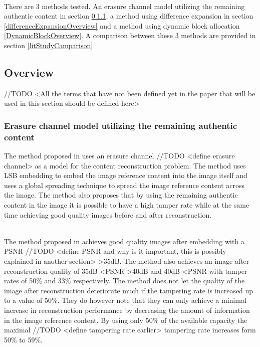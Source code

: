 \documentclass[12pt]{article}
\begin{document}
\hspace{0pt} \\
There are 3 methods tested. An erasure channel model utilizing the remaining authentic content in section \ref{ErasureChannelOverview}, a method using difference expansion in section \ref{differenceExpansionOverview} and a method using dynamic block allocation \ref{DynamicBlockOverview}. A comparison between these 3 methods are provided in section \ref{litStudyCamparison}

\subsection{Overview}
//TODO <All the terms that have not been defined yet in the paper that will be used in this section should be defined here>

\subsubsection{Erasure channel model utilizing the remaining authentic content}
\label{ErasureChannelOverview}
The method proposed in \cite {korus2013efficient} uses an erasure channel
//TODO <define erasure channel> 
as a model for the content reconstruction problem.
The method uses LSB embedding to embed the image reference content into the image itself and uses a global spreading technique to spread the image reference content across the image.
The method also proposes that by using the remaining authentic content in the image it is possible to have a high tamper rate while at the same time achieving good quality images before and after reconstruction.

\hspace{0pt} \\
The method proposed in \cite {korus2013efficient} achieves good quality images after embedding with a PSNR 
//TODO <define PSNR and why is it important, this is possibly explained in another section> 
\textgreater 35dB. 
The method also achieves an image after reconstruction quality of 35dB \textless PSNR \textgreater 40dB and 40dB \textless PSNR with tamper rates of 50\% and 33\% respectively.
The method does not let the quality of the image after reconstruction deteriorate much if the tampering rate is increased up to a value of 50\%.
They do however note that they can only achieve a minimal increase in reconstruction performance by decreasing the amount of information in the image reference content.
By using only 50\% of the available capacity the maximal 
//TODO <define tampering rate earlier>
 tampering rate increases form 50\% to 59\%.
\end{document}
